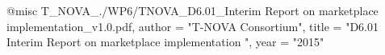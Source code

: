 @misc{ T_NOVA_./WP6/TNOVA_D6.01_Interim Report on marketplace implementation_v1.0.pdf,
       author = "T-NOVA Consortium",
       title = "D6.01 Interim Report on marketplace implementation ",
       year = "2015" }
